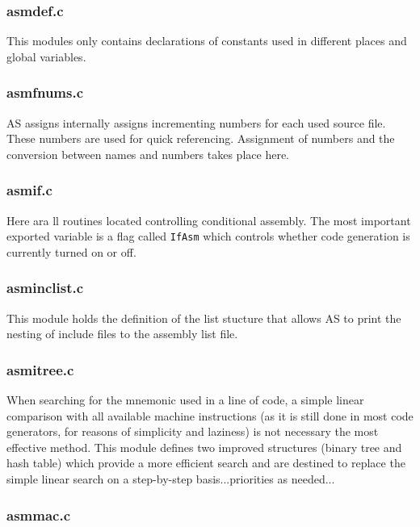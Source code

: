 \documentclass[12pt,twoside]{report}
\newcommand{\tty}[1]{{\tt #1}}
\begin{document}
\subsubsection{asmdef.c}

This modules only contains declarations of constants used in different
places and global variables.

\subsubsection{asmfnums.c}

AS assigns internally assigns incrementing numbers for each used source
file.  These numbers are used for quick referencing.  Assignment of
numbers and the conversion between names and numbers takes place here.

\subsubsection{asmif.c}

Here ara ll routines located controlling conditional assembly.  The most
important exported variable is a flag called \tty{IfAsm} which controls
whether code generation is currently turned on or off.

\subsubsection{asminclist.c}

This module holds the definition of the list stucture that allows AS to
print the nesting of include files to the assembly list file.

\subsubsection{asmitree.c}

When searching for the mnemonic used in a line of code, a simple linear
comparison with all available machine instructions (as it is still done in
most code generators, for reasons of simplicity and laziness) is not
necessary the most effective method.  This module defines two improved
structures (binary tree and hash table) which provide a more efficient
search and are destined to replace the simple linear search on a
step-by-step basis...priorities as needed...

\subsubsection{asmmac.c}
\end{document}
